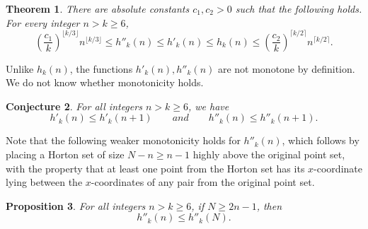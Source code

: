\documentclass[11pt]{article}
\theoremstyle{plain}
\newtheorem{theorem}{Theorem}[section]
\newtheorem{proposition}[theorem]{Proposition}
\newtheorem{conjecture}[theorem]{Conjecture}
\theoremstyle{definition}
\theoremstyle{remark}
\begin{document}
\begin{theorem}
There are absolute constants $c_1,c_2>0$ such that the following holds. For
every integer \(n>k\ge 6\),
\[
\left(\frac{c_1}{k}\right)^{\lfloor k/3\rfloor} n^{\lfloor k/3\rfloor}
\le h''_k(n) \le h'_k(n)\le h_k(n) \le
\left(\frac{c_2}{k}\right)^{\lceil k/2\rceil} n^{\lceil k/2\rceil}.
\]
\end{theorem}

Unlike \(h_k(n)\), the functions \(h'_k(n),h''_k(n)\) are
not monotone by definition. We do not know whether monotonicity holds.

\begin{conjecture}
For all integers \(n>k\ge 6\), we have 
\[
h'_k(n)\le h'_k(n+1)
\qquad and
\qquad
h''_k(n)\le h''_k(n+1). 
\]
\end{conjecture}

Note that the following weaker monotonicity holds for $h''_k(n)$, which follows by placing a Horton set of size $N-n \geq n-1$ highly above the original point set, with the property that at least one point from the Horton set has its $x$-coordinate lying between the $x$-coordinates of any pair from the original point set. 

\begin{proposition}
For all integers $n>k\geq 6$, if $N\geq 2n-1$, then 
\[
h''_k(n)\le h''_k(N).
\]
\end{proposition}
\end{document}

